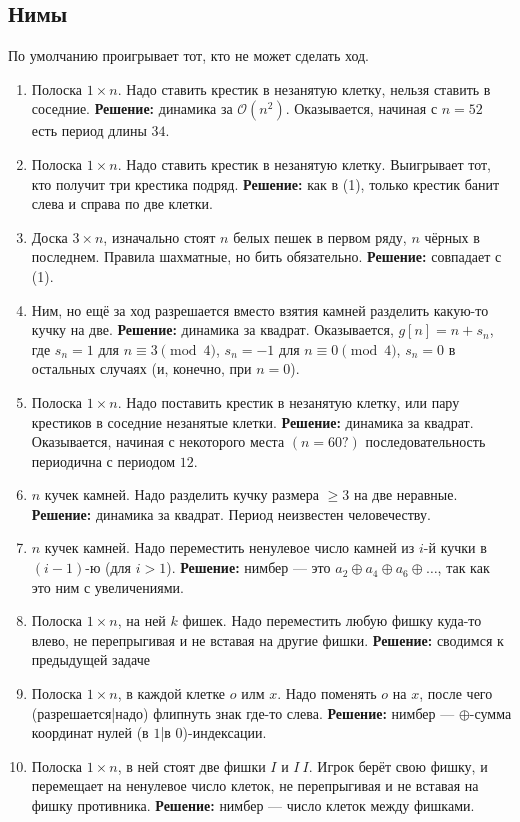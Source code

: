 \subsection{Нимы}
По умолчанию проигрывает тот, кто не может сделать ход.
\begin{enumerate}
\item Полоска $1\times n$. Надо ставить крестик в незанятую клетку, нельзя ставить в соседние.
\textbf{Решение:} динамика за $\mathcal{O}(n^2)$. Оказывается, начиная с $n = 52$ есть период длины $34$.
\item Полоска $1\times n$. Надо ставить крестик в незанятую клетку. Выигрывает тот, кто получит три крестика подряд. \textbf{Решение:} как в (1), только крестик банит слева и справа по две клетки.
\item Доска $3 \times n$, изначально стоят $n$ белых пешек в первом ряду, $n$ чёрных в последнем. Правила шахматные, но бить обязательно. \textbf{Решение: } совпадает с (1).
\item Ним, но ещё за ход разрешается вместо взятия камней разделить какую-то кучку на две. \textbf{Решение:} динамика за квадрат. Оказывается, $g[n] = n + s_n$, где $s_n = 1$ для $n \equiv 3 \pmod{4}$, $s_n = -1$ для $n \equiv 0 \pmod {4}$, $s_n = 0$ в остальных случаях (и, конечно, при $n = 0$).
\item Полоска $1 \times n$. Надо поставить крестик в незанятую клетку, или пару крестиков в соседние незанятые клетки. \textbf{Решение:} динамика за квадрат. Оказывается, начиная с некоторого места $(n = 60?)$ последовательность периодична с периодом $12$.
\item $n$ кучек камней. Надо разделить кучку размера $\ge 3$ на две неравные. \textbf{Решение:} динамика за квадрат. Период неизвестен человечеству.
\item $n$ кучек камней. Надо переместить ненулевое число камней из $i$-й кучки в $(i-1)$-ю (для $i > 1$). \textbf{Решение:} нимбер --- это $a_2 \oplus a_4 \oplus a_6 \oplus \dots$, так как это ним с увеличениями.
\item Полоска $1 \times n$, на ней $k$ фишек. Надо переместить любую фишку куда-то влево, не перепрыгивая и не вставая на другие фишки. \textbf{Решение:} сводимся к предыдущей задаче
\item Полоска $1 \times n$, в каждой клетке $o$ илм $x$. Надо поменять $o$ на $x$, после чего (разрешается|надо) флипнуть знак где-то слева. \textbf{Решение:} нимбер --- $\oplus$-сумма координат нулей (в $1$|в $0$)-индексации.
\item Полоска $1 \times n$, в ней стоят две фишки $I$ и $I\:I$. Игрок берёт свою фишку, и перемещает на ненулевое число клеток, не перепрыгивая и не вставая на фишку противника. \textbf{Решение:} нимбер --- число клеток между фишками.

\end{enumerate}

